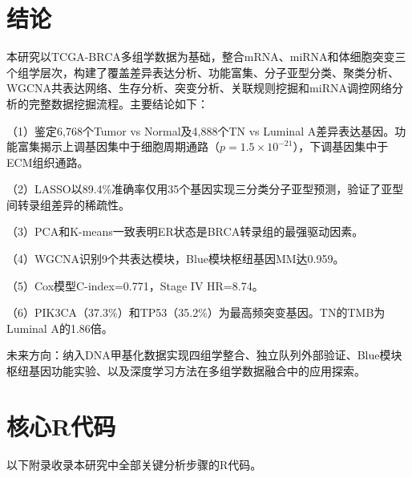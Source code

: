\documentclass[12pt,a4paper]{ctexart}
\begin{document}
\section{结论}

本研究以TCGA-BRCA多组学数据为基础，整合mRNA、miRNA和体细胞突变三个组学层次，构建了覆盖差异表达分析、功能富集、分子亚型分类、聚类分析、WGCNA共表达网络、生存分析、突变分析、关联规则挖掘和miRNA调控网络分析的完整数据挖掘流程。主要结论如下：

（1）鉴定6,768个Tumor vs Normal及4,888个TN vs Luminal A差异表达基因。功能富集揭示上调基因集中于细胞周期通路（$p=1.5\times10^{-21}$），下调基因集中于ECM组织通路。

（2）LASSO以89.4\%准确率仅用35个基因实现三分类分子亚型预测，验证了亚型间转录组差异的稀疏性。

（3）PCA和K-means一致表明ER状态是BRCA转录组的最强驱动因素。

（4）WGCNA识别9个共表达模块，Blue模块枢纽基因MM达0.959。

（5）Cox模型C-index=0.771，Stage IV HR=8.74。

（6）PIK3CA（37.3\%）和TP53（35.2\%）为最高频突变基因。TN的TMB为Luminal A的1.86倍。

未来方向：纳入DNA甲基化数据实现四组学整合、独立队列外部验证、Blue模块枢纽基因功能实验、以及深度学习方法在多组学数据融合中的应用探索。

\printbibliography

\newpage
\appendix
\section{核心R代码}

以下附录收录本研究中全部关键分析步骤的R代码。
\end{document}
